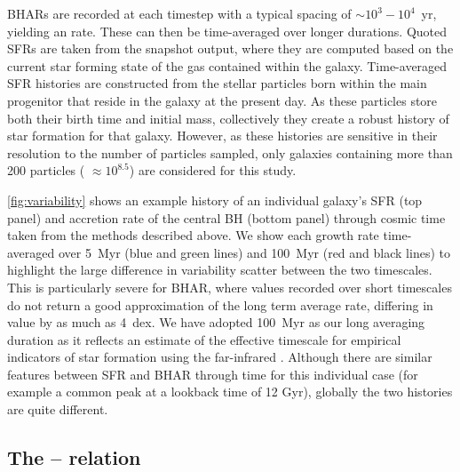 BHARs are recorded at each timestep with a typical spacing of $\sim 10^{3} -
10^{4}$~yr, yielding an  rate. These can then be
time-averaged over longer durations. Quoted  SFRs are
taken from the snapshot output, where they are computed based on the current
star forming state of the gas contained within the galaxy. Time-averaged SFR
histories are constructed from the stellar particles born within the main
progenitor that reside in the galaxy at the present day. As these particles
store both their birth time and initial mass, collectively they create a robust
history of star formation for that galaxy.  However, as these histories are
sensitive in their resolution to the number of particles sampled, only galaxies
containing more than 200 particles (\M{*[z=0]} $\approx 10^{8.5}$\Msol) are
considered for this study. 

\cref{fig:variability} shows an example history of an individual galaxy's SFR
(top panel) and accretion rate of the central BH (bottom panel) through cosmic
time taken from the methods described above. We show each growth rate
time-averaged over 5~Myr (blue and green lines) and 100~Myr (red and black
lines) to highlight the large difference in variability scatter between the two
timescales. This is particularly severe for BHAR, where values recorded over
short timescales do not return a good approximation of the long term average
rate, differing in value by as much as 4~dex. We have adopted 100~Myr as our
long averaging duration as it reflects an estimate of the effective timescale
for empirical indicators of star formation using the far-infrared \citep[FIR,
the tracer of star formation for the observational studies compared to in
\cref{sect:observations}, see the discussions
by][]{Neistein2014,Volonteri2015a}. Although there are similar features between
SFR and BHAR through time for this individual case (for example a common peak
at a lookback time of 12 Gyr), globally the two histories are quite different. 

\subsection{The -- relation}
\label{sect:eagle_bhs}

